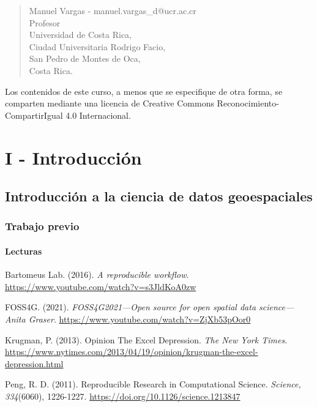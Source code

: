 \documentclass[
  letterpaper,
  DIV=11,
  numbers=noendperiod]{scrreprt}
\begin{document}
\begin{quote}
Manuel Vargas - manuel.vargas\_d@ucr.ac.cr\\
Profesor\\
Universidad de Costa Rica,\\
Ciudad Universitaria Rodrigo Facio,\\
San Pedro de Montes de Oca,\\
Costa Rica.
\end{quote}

Los contenidos de este curso, a menos que se especifique de otra forma,
se comparten mediante una licencia de Creative Commons
Reconocimiento-CompartirIgual 4.0 Internacional.

\part{I - Introducción}

\hypertarget{introducciuxf3n-a-la-ciencia-de-datos-geoespaciales}{%
\chapter{Introducción a la ciencia de datos
geoespaciales}\label{introducciuxf3n-a-la-ciencia-de-datos-geoespaciales}}

\hypertarget{trabajo-previo}{%
\section{Trabajo previo}\label{trabajo-previo}}

\hypertarget{lecturas}{%
\subsection{Lecturas}\label{lecturas}}

Bartomeus Lab. (2016). \emph{A reproducible workflow}.
\url{https://www.youtube.com/watch?v=s3JldKoA0zw}

FOSS4G. (2021). \emph{FOSS4G2021---Open source for open spatial data
science---Anita Graser}.
\url{https://www.youtube.com/watch?v=ZjXb53pOor0}

Krugman, P. (2013). Opinion \textbar{} The Excel Depression. \emph{The
New York Times}.
\url{https://www.nytimes.com/2013/04/19/opinion/krugman-the-excel-depression.html}

Peng, R. D. (2011). Reproducible Research in Computational Science.
\emph{Science, 334}(6060), 1226-1227.
\url{https://doi.org/10.1126/science.1213847}
\end{document}
